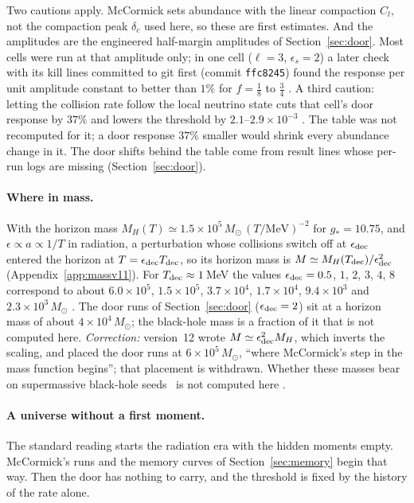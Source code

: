 Two cautions apply. McCormick sets abundance with the linear compaction $C_l$, not the compaction peak $\delta_c$ used here, so these are first estimates. And the amplitudes are the engineered half-margin amplitudes of Section~\ref{sec:door}. Most cells were run at that amplitude only; in one cell ($\ell=3$, $\epsilon_s=2$) a later check with its kill lines committed to git first (commit \texttt{ffc8245}) found the response per unit amplitude constant to better than $1\%$ for $f=\tfrac18$ to $\tfrac34$ . A third caution: letting the collision rate follow the local neutrino state cuts that cell's door response by $37\%$ and lowers the threshold by $2.1$--$2.9\times10^{-3}$ . The table was not recomputed for it; a door response $37\%$ smaller would shrink every abundance change in it. The door shifts behind the table come from result lines whose per-run logs are missing (Section~\ref{sec:door}).

\paragraph{Where in mass.} With the horizon mass $M_H(T)\simeq1.5\times10^5\,M_\odot\,(T/\mathrm{MeV})^{-2}$ for $g_*=10.75$, and $\epsilon\propto a\propto1/T$ in radiation, a perturbation whose collisions switch off at $\epsilon_{\rm dec}$ entered the horizon at $T=\epsilon_{\rm dec}T_{\rm dec}$, so its horizon mass is $M\simeq M_H(T_{\rm dec})/\epsilon_{\rm dec}^2$ (Appendix~\ref{app:massv11}). For $T_{\rm dec}\approx1$\,MeV the values $\epsilon_{\rm dec}=0.5$, $1$, $2$, $3$, $4$, $8$ correspond to about $6.0\times10^5$, $1.5\times10^5$, $3.7\times10^4$, $1.7\times10^4$, $9.4\times10^3$ and $2.3\times10^3\,M_\odot$ . The door runs of Section~\ref{sec:door} ($\epsilon_{\rm dec}=2$) sit at a horizon mass of about $4\times10^4\,M_\odot$; the black-hole mass is a fraction of it that is not computed here. \emph{Correction:} version~12 wrote $M\simeq\epsilon_{\rm dec}^2M_H$, which inverts the scaling, and placed the door runs at $6\times10^5\,M_\odot$, ``where McCormick's step in the mass function begins''; that placement is withdrawn. Whether these masses bear on supermassive black-hole seeds~\cite{Dave} is not computed here .

\paragraph{A universe without a first moment.} The standard reading starts the radiation era with the hidden moments empty. McCormick's runs and the memory curves of Section~\ref{sec:memory} begin that way. Then the door has nothing to carry, and the threshold is fixed by the history of the rate alone.

